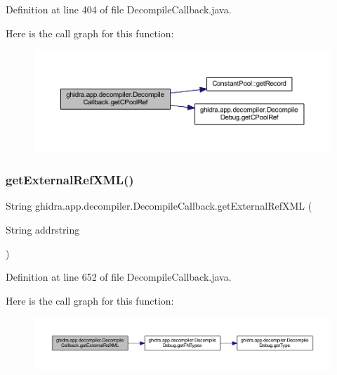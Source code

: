 Definition at line 404 of file Decompile\+Callback.\+java.

Here is the call graph for this function\+:
\nopagebreak
\begin{figure}[H]
\begin{center}
\leavevmode
\includegraphics[width=350pt]{classghidra_1_1app_1_1decompiler_1_1_decompile_callback_a238684d11918f682f50c0636f0a467ad_cgraph}
\end{center}
\end{figure}
\mbox{\label{classghidra_1_1app_1_1decompiler_1_1_decompile_callback_aa4c3b43fc7a4d06423c965fafdda81a2}} 
\subsubsection{\texorpdfstring{getExternalRefXML()}{getExternalRefXML()}}
{\footnotesize\ttfamily String ghidra.\+app.\+decompiler.\+Decompile\+Callback.\+get\+External\+Ref\+X\+ML (\begin{DoxyParamCaption}\item[{String}]{addrstring }\end{DoxyParamCaption})\hspace{0.3cm}{\ttfamily [inline]}}



Definition at line 652 of file Decompile\+Callback.\+java.

Here is the call graph for this function\+:
\nopagebreak
\begin{figure}[H]
\begin{center}
\leavevmode
\includegraphics[width=350pt]{classghidra_1_1app_1_1decompiler_1_1_decompile_callback_aa4c3b43fc7a4d06423c965fafdda81a2_cgraph}
\end{center}
\end{figure}
\mbox{\label{classghidra_1_1app_1_1decompiler_1_1_decompile_callback_aa74b281b85dd31d2edb2b70bd5b0744f}} 

